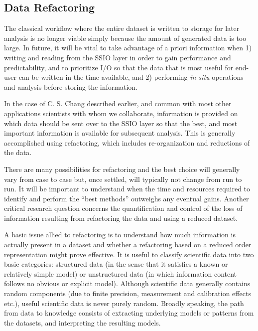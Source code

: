 \subsection{Data Refactoring} \label{sec:data-refactor} 

The classical workflow where the entire dataset is written to storage for
later analysis is no longer viable simply because the amount of generated data is too large.
In future, it will be vital to take advantage of a priori
information when 1) writing and reading from the SSIO layer in order to gain
performance and predictability, and to prioritize I/O so that the data that
is most useful for end-user can be written in the time available, and 2)
performing {\em in situ} operations and analysis before storing the information.

In the case of C. S. Chang described earlier, and common with most other
applications scientists with whom we collaborate, information is provided on
which data should be sent over to the SSIO layer so that the best, and most
important information is available for subsequent analysis.
This is generally accomplished using refactoring, which includes re-organization and reductions of the data.

There are many possibilities for refactoring and the best choice will generally
vary from case to case but, once settled, will typically not change from run to run. It
will be important to understand when the time and resources required to
identify and perform the ``best methods'' outweighs any eventual gains. Another
critical research question concerns the quantification and control of the loss
of information resulting from refactoring the data and using a reduced dataset. 

A basic issue allied to refactoring is to understand how much information is
actually present in a dataset and whether a refactoring based on a reduced
order representation might prove effective. It is useful to classify scientific
data into two basic categories: structured data (in the sense that it satisfies
a known or relatively simple model) or unstructured data (in which information
content follows no obvious or explicit model).  Although scientific data
generally contains random components (due to finite precision, measurement and
calibration effects etc.), useful scientific data is never purely random.
Broadly speaking, the path from data to knowledge consists of extracting
underlying models or patterns from the datasets, and interpreting the resulting
models. 

